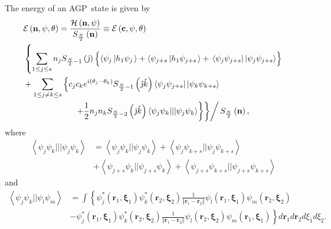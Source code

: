 \documentclass[aps,preprint]{revtex4}%
\begin{document}
The energy of an AGP\ state is given by
\begin{align*}
&  \mathcal{E}\left(  \mathbf{n},\mathbf{\psi,\theta}\right)  =\frac
{\mathcal{H}\left(  \mathbf{n},\mathbf{\psi}\right)  }{S_{\frac{N}{2}}\left(
\mathbf{n}\right)  }\equiv\mathcal{E}\left(  \mathbf{c},\mathbf{\psi,\theta
}\right) \\
&  \left\{  \sum_{1\leq j\leq s}n_{j}S_{\frac{N}{2}-1}\left(  \hat{\jmath
}\right)  \left\{  \overset{}{\left\langle \psi_{j}\left\vert h_{1}\psi
_{j}\right.  \right\rangle +\left\langle \psi_{j+s}\left\vert h_{1}\psi
_{j+s}\right.  \right\rangle }+\,\left\langle \psi_{j}\psi_{j+s}\right\vert
\left\vert \psi_{j}\psi_{j+s}\right\rangle \right\}  \right. \\
&  +\sum_{1\leq j\neq k\leq s}\left\{  c_{j}c_{k}e^{i\left(  \theta_{j}%
-\theta_{k}\right)  }S_{\frac{N}{2}-1}\left(  \hat{\jmath}\hat{k}\right)
\left\langle \psi_{j}\psi_{j+s}\right\vert \left\vert \psi_{k}\psi
_{k+s}\right\rangle \right. \\
&  \qquad\qquad\qquad\left.  \left.  \left.  +\frac{1}{2}\overset{}{n_{j}%
n_{k}S_{\frac{N}{2}-2}\left(  \hat{\jmath}\hat{k}\right)  \left\langle
\psi_{j}\psi_{k}|||\psi_{j}\psi_{k}\right\rangle }\right\}  \right\}  \right/
S_{\frac{N}{2}}\left(  \mathbf{n}\right)  ,
\end{align*}
where
\begin{align*}
\left\langle \psi_{j}\psi_{k}|||\psi_{j}\psi_{k}\right\rangle  &
=\left\langle \psi_{j}\psi_{k}||\psi_{j}\psi_{k}\right\rangle +\left\langle
\psi_{j}\psi_{k+s}||\psi_{j}\psi_{k+s}\right\rangle \\
&  +\left\langle \psi_{j+s}\psi_{k}||\psi_{j+s}\psi_{k}\right\rangle
+\left\langle \psi_{j+s}\psi_{k+s}||\psi_{j+s}\psi_{k+s}\right\rangle
\end{align*}
and
\begin{align*}
\left\langle \psi_{j}\psi_{k}||\psi_{l}\psi_{m}\right\rangle  &  =\int\left\{
\psi_{j}^{\ast}\left(  \mathbf{r}_{1}\mathbf{,\xi}_{1}\right)  \psi_{k}^{\ast
}\left(  \mathbf{r}_{2}\mathbf{,\xi}_{2}\right)  \frac{1}{\left\Vert
\mathbf{r}_{1}-\mathbf{r}_{2}\right\Vert }\psi_{l}\left(  \mathbf{r}%
_{1}\mathbf{,\xi}_{1}\right)  \psi_{m}\left(  \mathbf{r}_{2}\mathbf{,\xi}%
_{2}\right)  \right. \\
&  -\left.  \psi_{j}^{\ast}\left(  \mathbf{r}_{1}\mathbf{,\xi}_{1}\right)
\psi_{k}^{\ast}\left(  \mathbf{r}_{2}\mathbf{,\xi}_{2}\right)  \frac
{1}{\left\Vert \mathbf{r}_{1}-\mathbf{r}_{2}\right\Vert }\psi_{l}\left(
\mathbf{r}_{2}\mathbf{,\xi}_{2}\right)  \psi_{m}\left(  \mathbf{r}%
_{1}\mathbf{,\xi}_{1}\right)  \right\}  d\mathbf{r}_{1}d\mathbf{r}_{2}d\xi
_{1}d\xi_{2}.
\end{align*}
\end{document}

